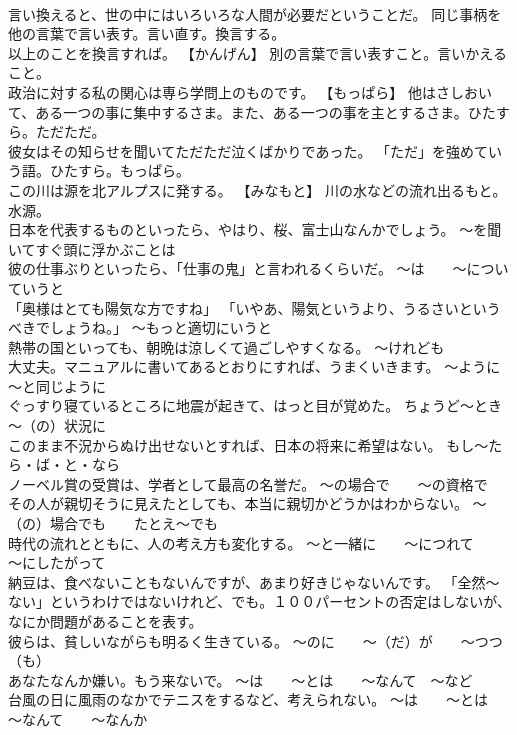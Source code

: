 \documentclass[8pt]{extreport}
\begin{document}
\begin{CJK}{UTF8}{min}
\\	言い換えると、世の中にはいろいろな人間が必要だということだ。	同じ事柄を他の言葉で言い表す。言い直す。換言する。
\\	以上のことを換言すれば。	【かんげん】 別の言葉で言い表すこと。言いかえること。
\\	政治に対する私の関心は専ら学問上のものです。	【もっぱら】 他はさしおいて、ある一つの事に集中するさま。また、ある一つの事を主とするさま。ひたすら。ただただ。
\\	彼女はその知らせを聞いてただただ泣くばかりであった。	「ただ」を強めていう語。ひたすら。もっぱら。
\\	この川は源を北アルプスに発する。	【みなもと】 川の水などの流れ出るもと。水源。
\\	日本を代表するものといったら、やはり、桜、富士山なんかでしょう。	～を聞いてすぐ頭に浮かぶことは
\\	彼の仕事ぶりといったら、「仕事の鬼」と言われるくらいだ。	～は　　～についていうと
\\	「奥様はとても陽気な方ですね」 「いやあ、陽気というより、うるさいというべきでしょうね。」	～もっと適切にいうと
\\	熱帯の国といっても、朝晩は涼しくて過ごしやすくなる。	～けれども
\\	大丈夫。マニュアルに書いてあるとおりにすれば、うまくいきます。	～ように　　～と同じように
\\	ぐっすり寝ているところに地震が起きて、はっと目が覚めた。	ちょうど～とき　　～（の）状況に
\\	このまま不況からぬけ出せないとすれば、日本の将来に希望はない。	もし～たら・ば・と・なら
\\	ノーベル賞の受賞は、学者として最高の名誉だ。	～の場合で　　～の資格で
\\	その人が親切そうに見えたとしても、本当に親切かどうかはわからない。	～（の）場合でも　　たとえ～でも
\\	時代の流れとともに、人の考え方も変化する。	～と一緒に　　～につれて　　～にしたがって
\\	納豆は、食べないこともないんですが、あまり好きじゃないんです。	「全然～ない」というわけではないけれど、でも。１００パーセントの否定はしないが、なにか問題があることを表す。
\\	彼らは、貧しいながらも明るく生きている。	～のに　　～（だ）が　　～つつ（も）
\\	あなたなんか嫌い。もう来ないで。	～は　　～とは　　～なんて　～など
\\	台風の日に風雨のなかでテニスをするなど、考えられない。	～は　　～とは　　～なんて　　～なんか

\end{CJK}
\end{document}
